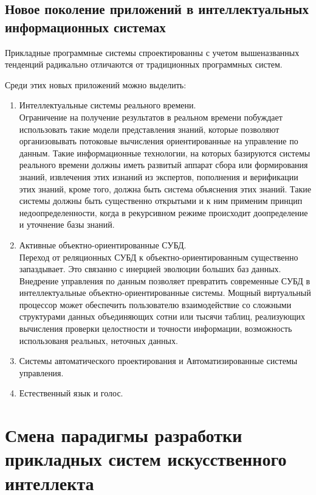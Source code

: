 \documentclass[a4paper,12pt]{report}
\begin{document}
\subsection{Новое поколение приложений в интеллектуальных информационных
	системах}

	Прикладные программные системы спроектированны с учетом вышеназванных
	тенденций радикально отличаются от традиционных программных систем.\par
	Среди этих новых приложений можно выделить:
	\begin{enumerate}
		\item Интеллектуальные системы реального времени.\\
			Ограничение на получение результатов в реальном времени побуждает
			использовать такие модели представления знаний, которые позволяют
			организовывать потоковые вычисления ориентированные на управление по
			данным. Такие информационные технологии, на которых базируются системы
			реального времени должны иметь развитый аппарат сбора или формирования
			знаний, извлечения этих изнаний из экспертов, пополнения и верификации
			этих знаний, кроме того, должна быть система объяснения этих знаний.
			Такие системы должны быть существенно открытыми и к ним применим принцип
			недоопределенности, когда в рекурсивном режиме происходит доопределение и
			уточнение базы знаний.
		\item Активные объектно-ориентированные СУБД.\\
			Переход от реляционных СУБД к объектно-ориентированным существенно
			запаздывает. Это связанно с инерцией эволюции больших баз данных.
			Внедрение управления по данным позволяет превратить современные СУБД в
			интеллектуальные объектно-ориентированные системы. Мощный виртуальный
			процессор может обеспечить пользователю взаимодействие со сложными
			структурами данных объединяющих сотни или тысячи таблиц, реализующих
			вычисления проверки целостности и точности информации, возможность
			использованя реальных, неточных данных.
		\item Системы автоматического проектирования и Автоматизированные системы
			управления.
		\item Естественный язык и голос.
	\end{enumerate}


\section{Смена парадигмы разработки прикладных систем искусственного
	интеллекта}
\end{document}
